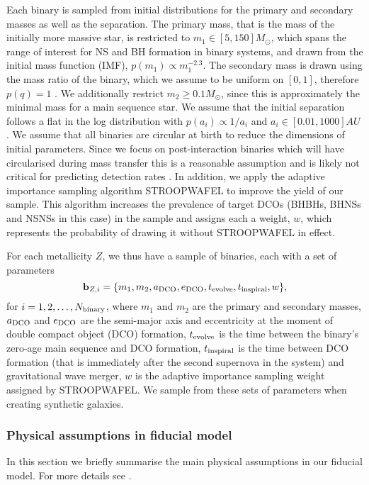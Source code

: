 Each binary is sampled from initial distributions for the primary and secondary masses as well as the separation. The primary mass, that is the mass of the initially more massive star, is restricted to $m_1 \in [5, 150] \unit{M_{\odot}}$, which spans the range of interest for NS and BH formation in binary systems, and drawn from the \citet{Kroupa+2001} initial mass function (IMF), $p(m_1) \propto m_1^{-2.3}$. The secondary mass is drawn using the mass ratio of the binary, which we assume to be uniform on $[0, 1]$, therefore $p(q) = 1$ \citep[consistent e.g. with][]{Sana+2012}. We additionally restrict $m_2 \ge 0.1 \unit{M_{\odot}}$, since this is approximately the minimal mass for a main sequence star. We assume that the initial separation follows a flat in the log distribution with $p(a_i) \propto 1 / a_i$ and $a_i \in [0.01, 1000] \unit{AU}$ \citep{Opik+1924, Abt+1983}. We assume that all binaries are circular at birth to reduce the dimensions of initial parameters. Since we focus on post-interaction binaries which will have circularised during mass transfer this is a reasonable assumption and is likely not critical for predicting detection rates \citep{Hurley+2002, deMink+2015}. In addition, we apply the adaptive importance sampling algorithm STROOPWAFEL \citep{Broekgaarden+2019} to improve the yield of our sample. This algorithm increases the prevalence of target DCOs (BHBHs, BHNSs and NSNSs in this case) in the sample and assigns each a weight, $w$, which represents the probability of drawing it without STROOPWAFEL in effect.

For each metallicity $Z$, we thus have a sample of binaries, each with a set of parameters
\begin{equation}
    \mathbf{b}_{{Z, i}} = \{m_1, m_2, a_{\rm DCO}, e_{\rm DCO}, t_{\rm evolve}, t_{\rm inspiral}, w\},
\end{equation}
for $i = 1, 2, \dots, N_{\rm binary}$, where $m_1$ and $m_2$ are the primary and secondary masses, $a_{\rm DCO}$ and $e_{\rm DCO}$ are the semi-major axis and eccentricity at the moment of double compact object (DCO) formation, $t_{\rm evolve}$ is the time between the binary's zero-age main sequence and DCO formation, $t_{\rm inspiral}$ is the time between DCO formation (that is immediately after the second supernova in the system) and gravitational wave merger, $w$ is the adaptive importance sampling weight assigned by STROOPWAFEL. We sample from these sets of parameters when creating synthetic galaxies.

\subsubsection{Physical assumptions in fiducial model}\label{sec:fiducial_physics}
In this section we briefly summarise the main physical assumptions in our fiducial model. For more details see \citet{Broekgaarden+2021}.

